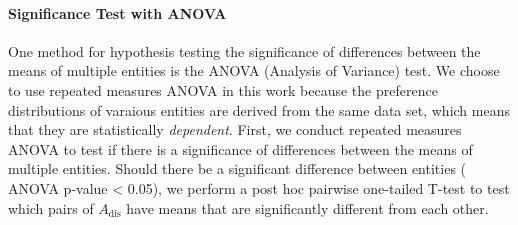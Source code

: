 \paragraph{Significance Test with ANOVA}
One method for hypothesis testing the significance of differences between the means of multiple entities is the ANOVA (Analysis of Variance) test. We choose to use repeated measures ANOVA in this work because the preference distributions of varaious entities are derived from the same data set, which means that they are statistically \textit{dependent}. First, we conduct repeated measures ANOVA to test if there is a significance of differences between the means of multiple entities. Should there be a significant difference between entities ( ANOVA p-value < 0.05), we perform a post hoc pairwise one-tailed T-test to test which pairs of $A_\mathrm{dis}$ have means that are significantly different from each other. 








